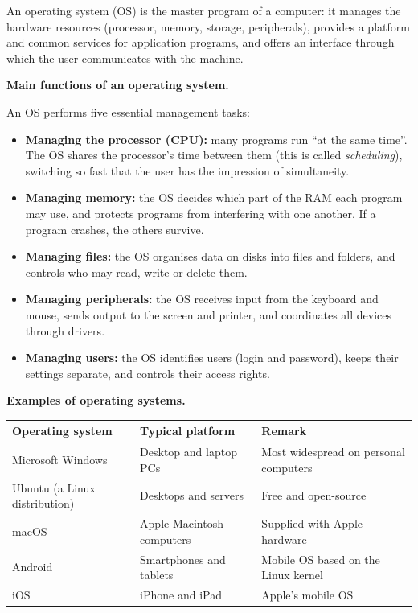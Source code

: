 \documentclass[11pt]{article}
\newcommand{\cle}[1]{{\popxbold\color{popdark}#1}}
\begin{document}
\begin{definition}
An \cle{operating system} (OS) is the master program of a computer: it manages the hardware resources (processor, memory, storage, peripherals), provides a platform and common services for application programs, and offers an interface through which the user communicates with the machine.
\end{definition}

\textbf{Main functions of an operating system.}\par
An OS performs five essential management tasks:

\begin{itemize}
\item \textbf{Managing the processor (CPU):} many programs run ``at the same time''. The OS shares the processor's time between them (this is called \emph{scheduling}), switching so fast that the user has the impression of simultaneity.
\item \textbf{Managing memory:} the OS decides which part of the RAM each program may use, and protects programs from interfering with one another. If a program crashes, the others survive.
\item \textbf{Managing files:} the OS organises data on disks into files and folders, and controls who may read, write or delete them.
\item \textbf{Managing peripherals:} the OS receives input from the keyboard and mouse, sends output to the screen and printer, and coordinates all devices through drivers.
\item \textbf{Managing users:} the OS identifies users (login and password), keeps their settings separate, and controls their access rights.
\end{itemize}

\textbf{Examples of operating systems.}\par
\begin{center}
\begin{tabularx}{\linewidth}{|l|X|X|}
\hline
\rowcolor{popblueL} \textbf{Operating system} & \textbf{Typical platform} & \textbf{Remark} \\
\hline
Microsoft Windows & Desktop and laptop PCs & Most widespread on personal computers \\
\hline
Ubuntu (a Linux distribution) & Desktops and servers & Free and open-source \\
\hline
macOS & Apple Macintosh computers & Supplied with Apple hardware \\
\hline
Android & Smartphones and tablets & Mobile OS based on the Linux kernel \\
\hline
iOS & iPhone and iPad & Apple's mobile OS \\
\hline
\end{tabularx}
\end{center}
\end{document}
